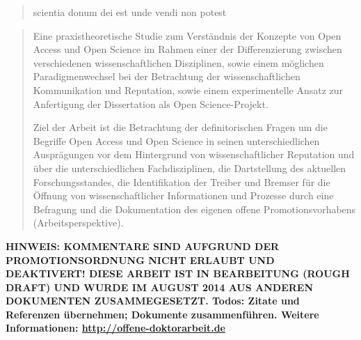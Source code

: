 
\begin{quote}
scientia donum dei est unde vendi non potest
\end{quote}


\begin{abstract}Eine praxistheoretische Studie zum Verständnis der Konzepte von Open Access und Open Science im Rahmen einer der Differenzierung zwischen verschiedenen wissenschaftlichen Disziplinen, sowie einem möglichen Paradigmenwechsel bei der Betrachtung der wissenschaftlichen Kommunikation und Reputation, sowie einem experimentelle Ansatz zur Anfertigung der Dissertation als Open Science-Projekt.

Ziel der Arbeit ist die Betrachtung der definitorischen Fragen um die Begriffe Open Access und Open Science in seinen unterschiedlichen Ausprägungen vor dem Hintergrund von wissenschaftlicher Reputation und über die unterschiedlichen Fachdisziplinen, die Dartstellung des aktuellen Forschungsstandes, die Identifikation der Treiber und Bremser für die Öffnung von wissenschaftlicher Informationen und Prozesse durch eine Befragung und die Dokumentation des eigenen offene Promotionsvorhabens (Arbeitsperspektive).
\end{abstract}

\textbf{HINWEIS: KOMMENTARE SIND AUFGRUND DER PROMOTIONSORDNUNG NICHT ERLAUBT UND DEAKTIVERT! DIESE ARBEIT IST IN BEARBEITUNG (ROUGH DRAFT) UND WURDE IM AUGUST 2014 AUS ANDEREN DOKUMENTEN ZUSAMMEGESETZT. Todos: Zitate und Referenzen übernehmen; Dokumente zusammenführen. Weitere Informationen: \href{http://offene-doktorarbeit.de}{http://offene-doktorarbeit.de}}
